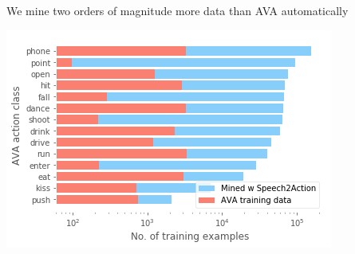 \documentclass[landscape,a0paper,fontscale=0.292]{baposter}
\begin{document}
\begin{poster}
{\begin{minipage}{0.7\linewidth}
\end{minipage}
\begin{minipage}{0.3\linewidth}
\begin{center}
\begin{tiny}We mine two orders of magnitude more data than AVA automatically
\end{tiny}
\vspace{-2em}
\includegraphics[width=0.9\linewidth]{images/training_dist.png}
\vspace{-0.8em}
        \end{center}
\end{minipage}
}

\end{poster}
\end{document}
